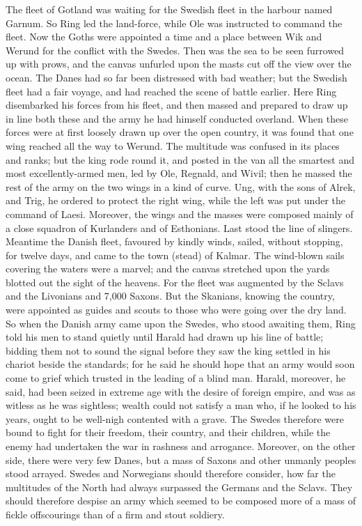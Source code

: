 \documentclass[10pt,a4paper]{report}
\begin{document}
The fleet of Gotland was waiting for the Swedish fleet in the harbour named Garnum. So Ring led the land-force, while Ole was instructed to command the fleet. Now the Goths were appointed a time and a place between Wik and Werund for the conflict with the Swedes. Then was the sea to be seen furrowed up with prows, and the canvas unfurled upon the masts cut off the view over the ocean. The Danes had so far been distressed with bad weather; but the Swedish fleet had a fair voyage, and had reached the scene of battle earlier. Here Ring disembarked his forces from his fleet, and then massed and prepared to draw up in line both these and the army he had himself conducted overland. When these forces were at first loosely drawn up over the open country, it was found that one wing reached all the way to Werund. The multitude was confused in its places and ranks; but the king rode round it, and posted in the van all the smartest and most excellently-armed men, led by Ole, Regnald, and Wivil; then he massed the rest of the army on the two wings in a kind of curve. Ung, with the sons of Alrek, and Trig, he ordered to protect the right wing, while the left was put under the command of Laesi. Moreover, the wings and the masses were composed mainly of a close squadron of Kurlanders and of Esthonians. Last stood the line of slingers.\\

Meantime the Danish fleet, favoured by kindly winds, sailed, without stopping, for twelve days, and came to the town (stead) of Kalmar. The wind-blown sails covering the waters were a marvel; and the canvas stretched upon the yards blotted out the sight of the heavens. For the fleet was augmented by the Sclavs and the Livonians and 7,000 Saxons. But the Skanians, knowing the country, were appointed as guides and scouts to those who were going over the dry land. So when the Danish army came upon the Swedes, who stood awaiting them, Ring told his men to stand quietly until Harald had drawn up his line of battle; bidding them not to sound the signal before they saw the king settled in his chariot beside the standards; for he said he should hope that an army would soon come to grief which trusted in the leading of a blind man. Harald, moreover, he said, had been seized in extreme age with the desire of foreign empire, and was as witless as he was sightless; wealth could not satisfy a man who, if he looked to his years, ought to be well-nigh contented with a grave. The Swedes therefore were bound to fight for their freedom, their country, and their children, while the enemy had undertaken the war in rashness and arrogance. Moreover, on the other side, there were very few Danes, but a mass of Saxons and other unmanly peoples stood arrayed. Swedes and Norwegians should therefore consider, how far the multitudes of the North had always surpassed the Germans and the Sclavs. They should therefore despise an army which seemed to be composed more of a mass of fickle offscourings than of a firm and stout soldiery.\\
\end{document}
